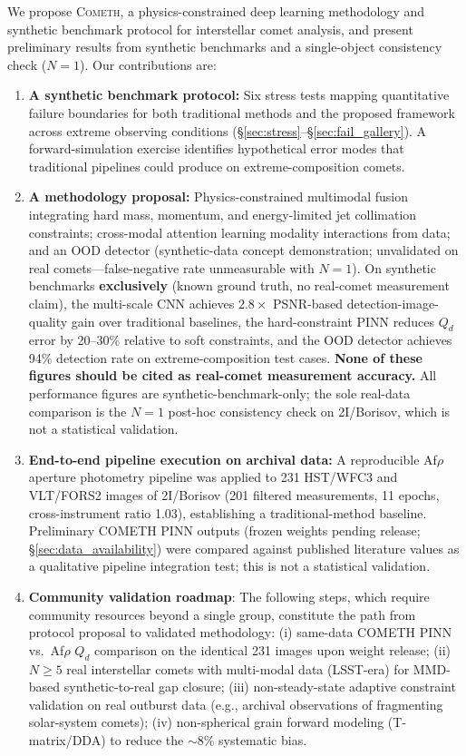 \documentclass[usenatbib]{mnras}
\begin{document}
We propose \textsc{Cometh}, a physics-constrained deep learning methodology and synthetic benchmark protocol for interstellar comet analysis, and present preliminary results from synthetic benchmarks and a single-object consistency check ($N=1$). Our contributions are:

\begin{enumerate}
    \item \textbf{A synthetic benchmark protocol:} Six stress tests mapping quantitative failure boundaries for both traditional methods and the proposed framework across extreme observing conditions (\S\ref{sec:stress}--\S\ref{sec:fail_gallery}). A forward-simulation exercise identifies hypothetical error modes that traditional pipelines could produce on extreme-composition comets.
    \item \textbf{A methodology proposal:} Physics-constrained multimodal fusion integrating hard mass, momentum, and energy-limited jet collimation constraints; cross-modal attention learning modality interactions from data; and an OOD detector (synthetic-data concept demonstration; unvalidated on real comets---false-negative rate unmeasurable with $N=1$). On synthetic benchmarks \textbf{exclusively} (known ground truth, no real-comet measurement claim), the multi-scale CNN achieves $2.8\times$ PSNR-based detection-image-quality gain over traditional baselines, the hard-constraint PINN reduces $Q_d$ error by 20--30\% relative to soft constraints, and the OOD detector achieves 94\% detection rate on extreme-composition test cases. \textbf{None of these figures should be cited as real-comet measurement accuracy.} All performance figures are synthetic-benchmark-only; the sole real-data comparison is the $N=1$ post-hoc consistency check on 2I/Borisov, which is not a statistical validation.
    \item \textbf{End-to-end pipeline execution on archival data:} A reproducible Af$\rho$ aperture photometry pipeline was applied to 231 HST/WFC3 and VLT/FORS2 images of 2I/Borisov (201 filtered measurements, 11 epochs, cross-instrument ratio 1.03), establishing a traditional-method baseline. Preliminary COMETH PINN outputs (frozen weights pending release; \S\ref{sec:data_availability}) were compared against published literature values as a qualitative pipeline integration test; this is not a statistical validation.
    \item \textbf{Community validation roadmap}\label{sec:roadmap}: The following steps, which require community resources beyond a single group, constitute the path from protocol proposal to validated methodology: (i) same-data COMETH PINN vs.\ Af$\rho$ $Q_d$ comparison on the identical 231 images upon weight release; (ii) $N \geq 5$ real interstellar comets with multi-modal data (LSST-era) for MMD-based synthetic-to-real gap closure; (iii) non-steady-state adaptive constraint validation on real outburst data (e.g., archival observations of fragmenting solar-system comets); (iv) non-spherical grain forward modeling (T-matrix/DDA) to reduce the $\sim$8\% systematic bias.
\end{enumerate}
\end{document}
